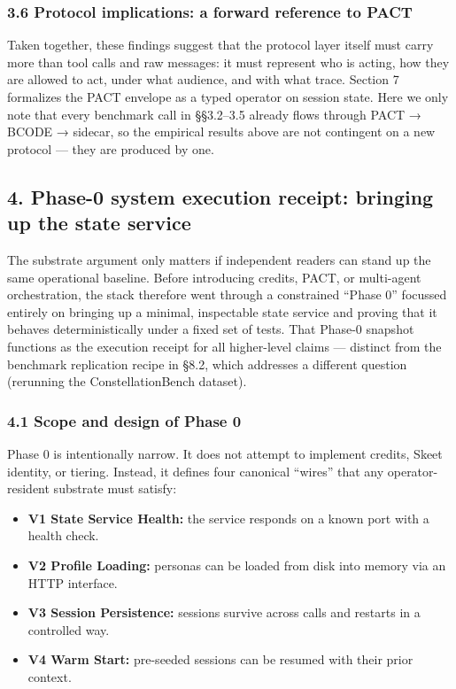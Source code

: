 \subsubsection{3.6 Protocol implications: a forward reference to
PACT}\label{protocol-implications-a-forward-reference-to-pact}

Taken together, these findings suggest that the protocol layer itself
must carry more than tool calls and raw messages: it must represent who
is acting, how they are allowed to act, under what audience, and with
what trace. Section 7 formalizes the PACT envelope as a typed operator
on session state. Here we only note that every benchmark call in
§§3.2--3.5 already flows through PACT → BCODE → sidecar, so the
empirical results above are not contingent on a new protocol --- they
are produced by one.

\subsection{4. Phase-0 system execution receipt: bringing up the state
service}\label{phase-0-system-execution-receipt-bringing-up-the-state-service}

The substrate argument only matters if independent readers can stand up
the same operational baseline. Before introducing credits, PACT, or
multi-agent orchestration, the stack therefore went through a
constrained ``Phase 0'' focussed entirely on bringing up a minimal,
inspectable state service and proving that it behaves deterministically
under a fixed set of tests. That Phase-0 snapshot functions as the
execution receipt for all higher-level claims --- distinct from the
benchmark replication recipe in §8.2, which addresses a different
question (rerunning the ConstellationBench dataset).

\subsubsection{4.1 Scope and design of Phase
0}\label{scope-and-design-of-phase-0}

Phase 0 is intentionally narrow. It does not attempt to implement
credits, Skeet identity, or tiering. Instead, it defines four canonical
``wires'' that any operator-resident substrate must satisfy:

\begin{itemize}
\tightlist
\item
  \textbf{V1 State Service Health:} the service responds on a known port
  with a health check.
\item
  \textbf{V2 Profile Loading:} personas can be loaded from disk into
  memory via an HTTP interface.
\item
  \textbf{V3 Session Persistence:} sessions survive across calls and
  restarts in a controlled way.
\item
  \textbf{V4 Warm Start:} pre-seeded sessions can be resumed with their
  prior context.
\end{itemize}

